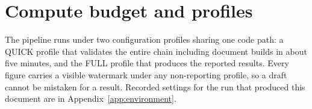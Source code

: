 \section{Compute budget and profiles}
The pipeline runs under two configuration profiles sharing one code path: a QUICK
profile that validates the entire chain including document builds in about five
minutes, and the FULL profile that produces the reported results. Every figure carries
a visible watermark under any non-reporting profile, so a draft cannot be mistaken for
a result. Recorded settings for the run that produced this document are in
Appendix~\ref{app:environment}.
